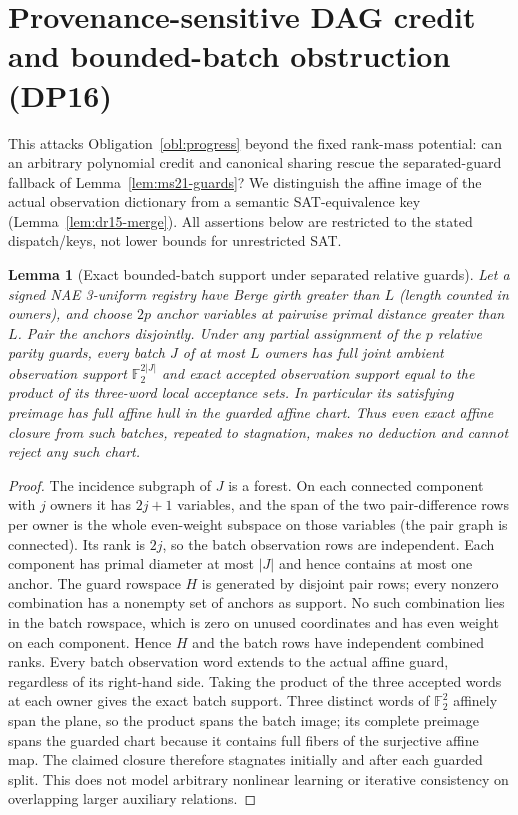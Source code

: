 \documentclass[11pt]{article}
\newtheorem{lemma}[theorem]{Lemma}
\begin{document}
\section{Provenance-sensitive DAG credit and bounded-batch obstruction (DP16)}\label{sec:dp16}
This attacks Obligation~\ref{obl:progress} beyond the fixed rank-mass potential: can an arbitrary polynomial credit and canonical sharing rescue the separated-guard fallback of Lemma~\ref{lem:ms21-guards}? We distinguish the affine image of the actual observation dictionary from a semantic SAT-equivalence key (Lemma~\ref{lem:dr15-merge}). All assertions below are restricted to the stated dispatch/keys, not lower bounds for unrestricted SAT.

\begin{lemma}[Exact bounded-batch support under separated relative guards]\label{lem:dp16-batch}
Let a signed NAE 3-uniform registry have Berge girth greater than $L$ (length counted in owners), and choose $2p$ anchor variables at pairwise primal distance greater than $L$. Pair the anchors disjointly. Under any partial assignment of the $p$ relative parity guards, every batch $J$ of at most $L$ owners has full joint ambient observation support $\mathbb F_2^{2|J|}$ and exact accepted observation support equal to the product of its three-word local acceptance sets. In particular its satisfying preimage has full affine hull in the guarded affine chart. Thus even exact affine closure from such batches, repeated to stagnation, makes no deduction and cannot reject any such chart.
\end{lemma}
\begin{proof}
The incidence subgraph of $J$ is a forest. On each connected component with $j$ owners it has $2j+1$ variables, and the span of the two pair-difference rows per owner is the whole even-weight subspace on those variables (the pair graph is connected). Its rank is $2j$, so the batch observation rows are independent. Each component has primal diameter at most $|J|$ and hence contains at most one anchor. The guard rowspace $H$ is generated by disjoint pair rows; every nonzero combination has a nonempty set of anchors as support. No such combination lies in the batch rowspace, which is zero on unused coordinates and has even weight on each component. Hence $H$ and the batch rows have independent combined ranks. Every batch observation word extends to the actual affine guard, regardless of its right-hand side. Taking the product of the three accepted words at each owner gives the exact batch support. Three distinct words of $\mathbb F_2^2$ affinely span the plane, so the product spans the batch image; its complete preimage spans the guarded chart because it contains full fibers of the surjective affine map. The claimed closure therefore stagnates initially and after each guarded split. This does not model arbitrary nonlinear learning or iterative consistency on overlapping larger auxiliary relations.
\end{proof}
\end{document}
